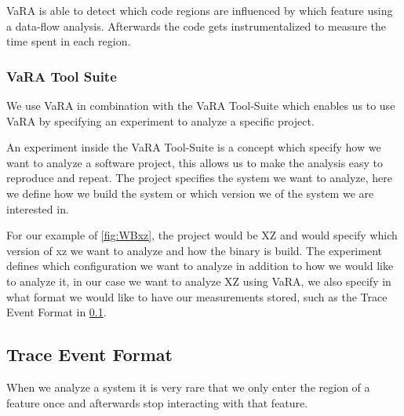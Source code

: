 VaRA is able to 
detect which code regions are influenced by which feature using a data-flow analysis. Afterwards the code gets instrumentalized to measure the time
spent in each region. \cite{VaRA-Flo}

\subsubsection{VaRA Tool Suite}
We use VaRA in combination with the VaRA Tool-Suite which enables us to use VaRA by specifying an experiment to analyze a specific project. 

An experiment inside the VaRA Tool-Suite is a concept which specify how we want to analyze a software project, this allows us to make the analysis
easy to reproduce and repeat. The project specifies the system we want to analyze, here we  define how we build the system or which version we 
of the system we are interested in. 

For our example of \autoref{fig:WBxz}, the project would be XZ and would specify which version of xz we want to analyze and how the binary is build.
The experiment defines which configuration we want to analyze in addition to how we would like to analyze it, in our case we want to analyze 
XZ using VaRA, we also specify in what format we would like to have our measurements stored, such as the Trace Event Format in \ref{trace-event}.

\subsection{Trace Event Format}\label{trace-event}
When we analyze a system it is very rare that we only enter the region of a feature once and afterwards stop interacting with that feature. 